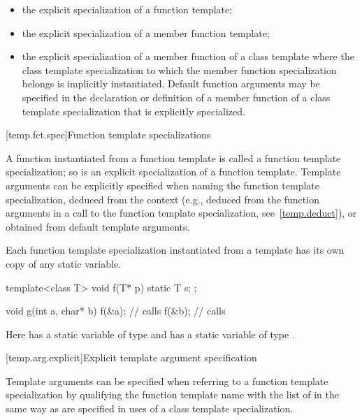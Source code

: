 \begin{itemize}
\item
the explicit specialization of a function template;
\item
the explicit specialization of a member function template;
\item
the explicit specialization of a member function of a class template where
the class template specialization to which the member function specialization
belongs is implicitly instantiated.
\enternote
Default function arguments may be specified in the declaration or
definition of a member function of a class template specialization that is
explicitly specialized.
\exitnote
\end{itemize}

[temp.fct.spec]{Function template specializations}

\pnum
{}%
A function instantiated from a function template is called a function template
specialization; so is an explicit specialization of a function template.
Template arguments can be explicitly specified when naming the function
template specialization, deduced from the context (e.g.,
deduced from the function arguments in a call to the function template
specialization, see~\ref{temp.deduct}), or obtained from default template arguments.

\pnum
Each function template specialization instantiated from a template
has its own copy of any static variable.
\enterexample

\begin{codeblock}
template<class T> void f(T* p) {
  static T s;
};

void g(int a, char* b) {
  f(&a);            // calls 
  f(&b);            // calls 
}
\end{codeblock}

Here
has a static variable
of type
and
has a static variable
of type
.
\exitexample

[temp.arg.explicit]{Explicit template argument specification}

\pnum
{}%
Template arguments can be specified when referring to a function
template specialization by qualifying the function template
name with the list of
in the same way as
are specified in uses of a class template specialization.
\enterexample

